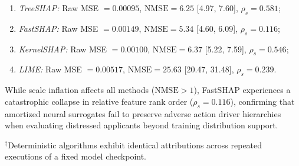 \documentclass[conference]{IEEEtran}
\begin{document}
\begin{itemize}
    \begin{enumerate}
        \item \textit{TreeSHAP:} Raw MSE $= 0.00095$, $\text{NMSE} = 6.25$ [4.97, 7.60], $\rho_s = 0.581$;
        \item \textit{FastSHAP:} Raw MSE $= 0.00149$, $\text{NMSE} = 5.34$ [4.60, 6.09], $\rho_s = \mathbf{0.116}$;
        \item \textit{KernelSHAP:} Raw MSE $= 0.00100$, $\text{NMSE} = 6.37$ [5.22, 7.59], $\rho_s = 0.546$;
        \item \textit{LIME:} Raw MSE $= 0.00517$, $\text{NMSE} = \mathbf{25.63}$ [20.47, 31.48], $\rho_s = 0.239$.
    \end{enumerate}
    While scale inflation affects all methods ($\text{NMSE} > 1$), FastSHAP experiences a catastrophic collapse in relative feature rank order ($\rho_s = 0.116$), confirming that amortized neural surrogates fail to preserve adverse action driver hierarchies when evaluating distressed applicants beyond training distribution support.
\end{itemize}

\begin{table}[htbp]
\caption{Explanation Stability and Robustness Under Stochastic Seeds, Retraining, and Input Perturbations ($N=200$)}
\label{tab:robustness}
\centering
{}
\vspace{1mm}
\begin{minipage}{\columnwidth}
\scriptsize $^\dagger$Deterministic algorithms exhibit identical attributions across repeated executions of a fixed model checkpoint.
\end{minipage}
\end{table}
\end{document}
